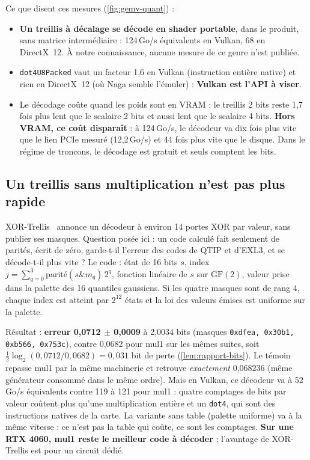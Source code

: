 Ce que disent ces mesures (\cref{fig:gemv-quant}) :
\begin{itemize}
\item \textbf{Un treillis à décalage se décode en shader portable}, dans le produit, sans matrice intermédiaire : 124\,Go/s équivalents en Vulkan, 68 en DirectX~12. À notre connaissance, aucune mesure de ce genre n'est publiée.
\item \texttt{dot4U8Packed} vaut un facteur 1,6 en Vulkan (instruction entière native) et rien en DirectX~12 (où Naga semble l'émuler) : \textbf{Vulkan est l'API à viser}.
\item Le décodage coûte quand les poids sont en VRAM : le treillis 2 bits reste 1,7 fois plus lent que le scalaire 2 bits et aussi lent que le scalaire 4 bits. \textbf{Hors VRAM, ce coût disparaît} : à 124\,Go/s, le décodeur va dix fois plus vite que le lien PCIe mesuré (12,2\,Go/s) et 44 fois plus vite que le disque. Dans le régime de troncons, le décodage est gratuit et seuls comptent les bits.
\end{itemize}

\subsection{Un treillis sans multiplication n'est pas plus rapide}

XOR-Trellis~\cite{xortrellis2026} annonce un décodeur à environ 14 portes XOR par valeur, sans publier ses masques. Question posée ici : un code calculé fait seulement de parités, écrit de zéro, garde-t-il l'erreur des codes de QTIP et d'EXL3, et se décode-t-il plus vite ? Le code : état de 16 bits $s$, index $j = \sum_{q=0}^{3} \mathrm{parité}(s \mathbin{\&} m_q)\, 2^q$, fonction linéaire de $s$ sur $\mathrm{GF}(2)$, valeur prise dans la palette des 16 quantiles gaussiens. Si les quatre masques sont de rang 4, chaque index est atteint par $2^{12}$ états et la loi des valeurs émises est uniforme sur la palette.

Résultat \mes : \textbf{erreur 0,0712 $\pm$ 0,0009} à 2,0034 bits (masques \texttt{0xdfea, 0x30b1, 0xb566, 0x753c}), contre 0,0682 pour mul1 sur les mêmes suites, soit $\tfrac12\log_2(0{,}0712/0{,}0682) = 0{,}031$ bit de perte (\cref{lem:rapport-bits}). Le témoin repasse mul1 par la même machinerie et retrouve \emph{exactement} 0,068236 (même générateur consommé dans le même ordre). Mais en Vulkan, ce décodeur va à 52\,Go/s équivalents contre 119 à 121 pour mul1 : quatre comptages de bits par valeur coûtent plus qu'une multiplication entière et un \texttt{dot4}, qui sont des instructions natives de la carte. La variante sans table (palette uniforme) va à la même vitesse : ce n'est pas la table qui coûte, ce sont les comptages. \textbf{Sur une RTX 4060, mul1 reste le meilleur code à décoder} ; l'avantage de XOR-Trellis est pour un circuit dédié.

